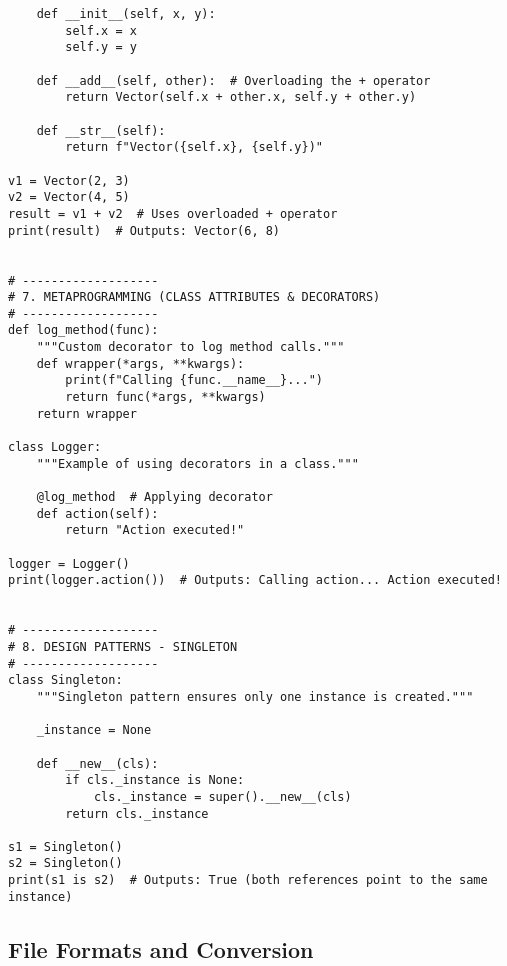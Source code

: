 \begin{verbatim}
    def __init__(self, x, y):
        self.x = x
        self.y = y

    def __add__(self, other):  # Overloading the + operator
        return Vector(self.x + other.x, self.y + other.y)

    def __str__(self):
        return f"Vector({self.x}, {self.y})"

v1 = Vector(2, 3)
v2 = Vector(4, 5)
result = v1 + v2  # Uses overloaded + operator
print(result)  # Outputs: Vector(6, 8)


# -------------------
# 7. METAPROGRAMMING (CLASS ATTRIBUTES & DECORATORS)
# -------------------
def log_method(func):
    """Custom decorator to log method calls."""
    def wrapper(*args, **kwargs):
        print(f"Calling {func.__name__}...")
        return func(*args, **kwargs)
    return wrapper

class Logger:
    """Example of using decorators in a class."""
    
    @log_method  # Applying decorator
    def action(self):
        return "Action executed!"

logger = Logger()
print(logger.action())  # Outputs: Calling action... Action executed!


# -------------------
# 8. DESIGN PATTERNS - SINGLETON
# -------------------
class Singleton:
    """Singleton pattern ensures only one instance is created."""
    
    _instance = None

    def __new__(cls):
        if cls._instance is None:
            cls._instance = super().__new__(cls)
        return cls._instance

s1 = Singleton()
s2 = Singleton()
print(s1 is s2)  # Outputs: True (both references point to the same instance)
\end{verbatim}

\subsection{File Formats and Conversion}

